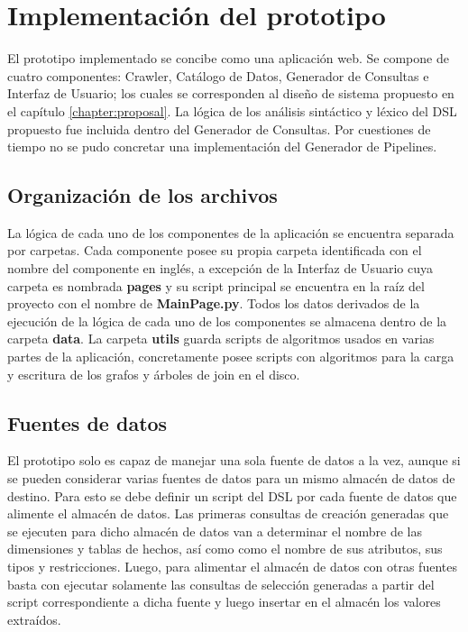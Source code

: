 \section{Implementación del prototipo}\label{section:prototype}

El prototipo implementado se concibe como una aplicaci\'on web. Se compone de cuatro componentes: Crawler, Cat\'alogo de Datos, Generador de Consultas 
e Interfaz de Usuario; los cuales se corresponden al diseño de sistema propuesto en el cap\'itulo \ref{chapter:proposal}. 
La l\'ogica de los an\'alisis sintáctico y l\'exico del DSL propuesto fue incluida dentro del Generador de Consultas. 
Por cuestiones de tiempo no se pudo concretar una implementaci\'on del Generador de Pipelines.

\subsection{Organización de los archivos}

La l\'ogica de cada uno de los componentes de la aplicaci\'on se encuentra separada por carpetas. Cada componente 
posee su propia carpeta identificada con el nombre del componente en ingl\'es, a excepción de la Interfaz de Usuario 
cuya carpeta es nombrada \textbf{pages} y su script principal se encuentra en la ra\'iz del proyecto con el nombre de 
\textbf{MainPage.py}. Todos los datos derivados de la ejecución de la l\'ogica de cada uno de los componentes 
se almacena dentro de la carpeta \textbf{data}. La carpeta \textbf{utils} guarda scripts de algoritmos usados 
en varias partes de la aplicaci\'on, concretamente posee scripts con algoritmos para la carga y escritura de los 
grafos y \'arboles de join en el disco.

\subsection{Fuentes de datos}

El prototipo solo es capaz de manejar una sola fuente de datos a la vez, aunque si se pueden considerar varias 
fuentes de datos para un mismo almac\'en de datos de destino. Para esto se debe definir un script del DSL por 
cada fuente de datos que alimente el almac\'en de datos. Las primeras consultas de creación generadas que se ejecuten 
para dicho almac\'en de datos van a determinar el nombre de las dimensiones y tablas de hechos, as\'i como 
como el nombre de sus atributos, sus tipos y restricciones. Luego, para alimentar el almac\'en de datos con otras 
fuentes basta con ejecutar solamente las consultas de selecci\'on generadas a partir del script correspondiente a 
dicha fuente y luego insertar en el almac\'en los valores extra\'idos.

